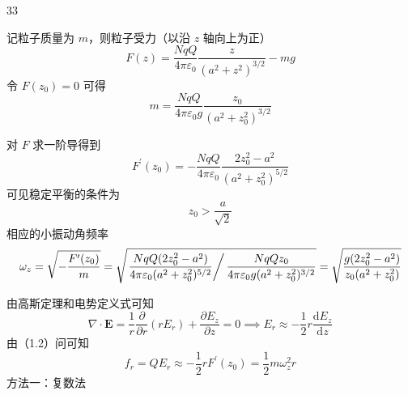 \begin{solution}{33}
    \begin{subsolution}
        \begin{subsubsolution}
            记粒子质量为 $m$，则粒子受力（以沿 $z$ 轴向上为正）
            \begin{equation}
                F (z) = \frac {N q Q}{4 \pi \varepsilon_ {0}} \frac {z}{(a ^ {2} + z ^ {2}) ^ {3 / 2}} - m g
                \label{eq:1.s33}
            \end{equation}
            令 $F(z_0) = 0$ 可得
            \begin{equation}
                m = \frac {N q Q}{4 \pi \varepsilon_ {0} g} \frac {z _ {0}}{(a ^ {2} + z _ {0} ^ {2}) ^ {3 / 2}}
                \label{eq:2.s33}
            \end{equation}
        \end{subsubsolution}
        \begin{subsubsolution}
            对 $F$ 求一阶导得到
            \begin{equation}
                F ^ {\prime} (z _ {0}) = - \frac {N q Q}{4 \pi \varepsilon_ {0}} \frac {2 z _ {0} ^ {2} - a ^ {2}}{(a ^ {2} + z _ {0} ^ {2}) ^ {5 / 2}}
                \label{eq:3.s33}
            \end{equation}
            可见稳定平衡的条件为
            \begin{equation}
                z _ {0} > \frac {a}{\sqrt {2}}
                \label{eq:4.s33}
            \end{equation}
            相应的小振动角频率
            \begin{equation}
                \omega_ {z} = \sqrt {- \frac {F ^ {\prime} (z _ {0})}{m}} = \sqrt {\left. \frac {N q Q (2 z _ {0} ^ {2} - a ^ {2})}{4 \pi \varepsilon_ {0} (a ^ {2} + z _ {0} ^ {2}) ^ {5 / 2}} \right/ \frac {N q Q z _ {0}}{4 \pi \varepsilon_ {0} g (a ^ {2} + z _ {0} ^ {2}) ^ {3 / 2}}} = \sqrt {\frac {g (2 z _ {0} ^ {2} - a ^ {2})}{z _ {0} (a ^ {2} + z _ {0} ^ {2})}}
                \label{eq:5.s33}
            \end{equation}
        \end{subsubsolution}
    \end{subsolution}
    \begin{subsolution}
        \begin{subsubsolution}
            由高斯定理和电势定义式可知
            \begin{equation}
                \nabla \cdot \pmb {E} = \frac {1}{r} \frac {\partial}{\partial r} (r E _ {r}) + \frac {\partial E _ {z}}{\partial z} = 0 \implies E _ {r} \approx - \frac {1}{2} r \frac {\mathrm{d} E _ {z}}{\mathrm{d} z}
                \label{eq:6.s33}
            \end{equation}
            由（1.2）问可知
            \begin{equation}
                f _ {r} = Q E _ {r} \approx - \frac {1}{2} r F ^ {\prime} (z _ {0}) = \frac {1}{2} m \omega_ {z} ^ {2} r
                \label{eq:7.s33}
            \end{equation}
            方法一：复数法


\end{subsubsolution}
\end{subsolution}
\end{solution}
